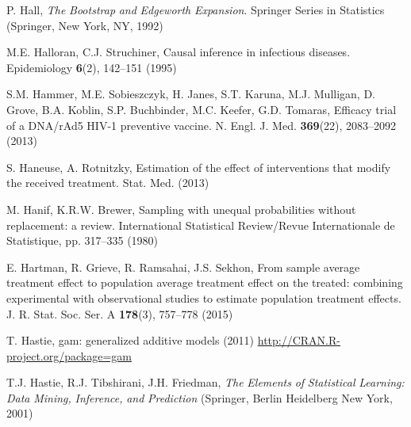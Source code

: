 \begin{list}{}{\setlength{\leftmargin}{2.1em}\setlength{\labelwidth}{0pt}
  \setlength{\labelsep}{0pt}\setlength{\itemindent}{-2.1em}
  \setlength{\parsep}{0pt}\setlength{\itemsep}{2pt}\setlength{\topsep}{0pt}}
\item\label{refentry:REF143}P. Hall, \textit{The} \textit{Bootstrap} \textit{and} \textit{Edgeworth} \textit{Expansion}. Springer Series in Statistics (Springer, New York, NY, 1992)\label{refend:REF143}
\item\label{refentry:REF144}M.E. Halloran, C.J. Struchiner, Causal inference in infectious diseases. Epidemiology \textbf{6}(2), 142--151 (1995)\label{refend:REF144}
\item\label{refentry:REF145}S.M. Hammer, M.E. Sobieszczyk, H. Janes, S.T. Karuna, M.J. Mulligan, D. Grove, B.A. Koblin, S.P. Buchbinder, M.C. Keefer, G.D. Tomaras, Efficacy trial of a DNA/rAd5 HIV-1 preventive vaccine. N. Engl. J. Med. \textbf{369}(22), 2083--2092 (2013)\label{refend:REF145}
\item\label{refentry:REF146}S. Haneuse, A. Rotnitzky, Estimation of the effect of interventions that modify the received treatment. Stat. Med. (2013)\label{refend:REF146}
\item\label{refentry:REF147}M. Hanif, K.R.W. Brewer, Sampling with unequal probabilities without replacement: a review. International Statistical Review/Revue Internationale de Statistique, pp. 317--335 (1980)\label{refend:REF147}
\item\label{refentry:REF148}E. Hartman, R. Grieve, R. Ramsahai, J.S. Sekhon, From sample average treatment effect to population average treatment effect on the treated: combining experimental with observational studies to estimate population treatment effects. J. R. Stat. Soc. Ser. A \textbf{178}(3), 757--778 (2015)\label{refend:REF148}
\item\label{refentry:REF149}T. Hastie, gam: generalized additive models (2011) \url{http://CRAN.R-project.org/package=gam}\label{refend:REF149}
\item\label{refentry:REF150}T.J. Hastie, R.J. Tibshirani, J.H. Friedman, \textit{The} \textit{Elements} \textit{of} \textit{Statistical} \textit{Learning:} \textit{Data} \textit{Mining,} \textit{Inference,} \textit{and} \textit{Prediction} (Springer, Berlin Heidelberg New York, 2001)\label{refend:REF150}

\end{list}
